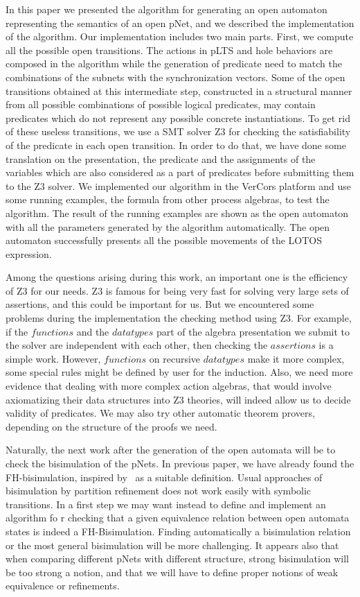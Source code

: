\documentclass{lncs/llncs}
\begin{document}
In this paper we presented the algorithm for generating an open
automaton representing the semantics of an open pNet, and we described
the implementation of the
algorithm. Our implementation includes two main parts. First, we
compute all the possible open transitions. The actions in pLTS and
hole behaviors are composed in the algorithm while the generation of
predicate need to match the combinations of the subnets with the
synchronization vectors. Some of the open transitions obtained at this
intermediate step, constructed in a structural manner from all
possible combinations of possible logical predicates, may
contain predicates which do not represent any possible concrete
instantiations. 
To get rid of these useless transitions, we use a SMT solver Z3 for checking the
satisfiability of the predicate in each open transition. In
order to do that, we have done some translation on the presentation,
the predicate and the assignments of the variables which are also
considered as a part of predicates before submitting them to the
Z3 solver. We implemented our algorithm in the VerCors platform and use some
running examples, the formula from other process algebras, to test the
algorithm. The result of the running examples are shown as the open
automaton with all the parameters generated by the algorithm
automatically. The open automaton successfully presents all the
possible movements of the LOTOS expression.   

Among the questions arising during this work, an important one is the
efficiency of Z3 for our needs. Z3 is famous for being very fast for
solving very large sets of assertions, and this could be important for
us. But we encountered  some problems during the implementation the
checking method using Z3. For example, if the $functions$ and the
$datatypes$ part of the algebra presentation we submit to the solver
are independent with each other, then checking the $assertions$ is a
simple work. However, $functions$ on recursive $datatypes$ make it
more complex, some special rules might be defined by user for the
induction. Also, we need more evidence that dealing with more complex
action algebras, that would involve axiomatizing their data structures
into Z3 theories, will indeed allow us to decide validity of
predicates.
We may also try other automatic theorem provers, depending on the structure of the proofs we need.

Naturally, the next work after the generation of the open automata
will be to check the bisimulation of the pNets. In previous paper, we
have already found the FH-bisimulation, inspired by~\cite{deSimone85} as a
suitable definition. Usual approaches of bisimulation by partition
refinement does not work easily with symbolic transitions. In a first
step we may want instead to define and implement an algorithm fo
r checking that a given equivalence relation between open automata
states is indeed a FH-Bisimulation. Finding automatically a
bisimulation relation or the most general bisimulation will be more
challenging. It appears also that when comparing different pNets with
different structure, strong bisimulation will be too strong a notion,
and that we will have to define proper notions of weak equivalence or
refinements. 
\end{document}
